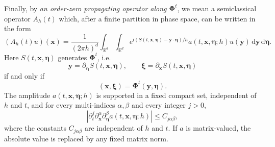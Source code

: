 \documentclass[11pt,reqno]{amsart}
\newcommand{\ii}{\mathrm{i}}
\newcommand{\dd}{\,\mathrm{d}}
\numberwithin{equation}{section}
\begin{document}
\begin{appendix}
Finally, by \emph{an order-zero propagating operator along $\bm\Phi^t$}, we mean a semiclassical operator $A_h(t)$ which, after a finite partition in phase space, can be written in the form 
$$
    (A_h(t)u)(\bm{x}) = \frac{1}{(2\pi h)^d}\int_{\mathbb{R}^d}\int_{\mathbb{R}^d} e^{\ii(S(t,\bm{x},\bm{\eta})-\bm{y}\cdot\bm{\eta})/h}a(t,\bm{x},\bm{\eta};h)u(\bm{y})\dd\bm{y}\dd\bm{\eta}.
$$
Here $S(t,\bm{x},\bm{\eta})$ generates $\bm{\Phi}^t$, i.e. 
$$
\bm{y}=\partial_{\bm\eta}S(t,\bm{x},\bm{\eta}), \qquad \bm{\xi}=\partial_{\bm{x}}S(t,\bm{x},\bm{\eta})
$$ 
if and only if 
$$
(\bm{x},\bm{\xi})=\bm{\Phi}^t(\bm{y},\bm{\eta}).
$$ 
The amplitude $a(t,\bm{x},\bm{\eta};h)$ is supported in a fixed compact set, independent of $h$ and $t$, and for every multi-indices $\alpha, \beta$ and every integer $j>0$,
$$
    |\partial_t^j\partial_{\bm{x}}^\alpha\partial_{\bm{\eta}}^\beta a(t,\bm{x},\bm{\eta};h)|\leq C_{j\alpha\beta}, 
$$
where the constants $C_{j\alpha\beta}$ are independent of $h$ and $t$. If $a$ is matrix-valued, the absolute value is replaced by any fixed matrix norm.

\end{appendix}
\end{document}
